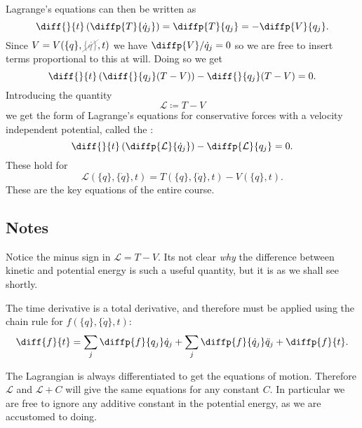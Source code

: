 \documentclass[fleqn]{NotesClass}
\newcommand*{\nodependence}[1]{\textcolor{gray}{\cancel{#1}}}
\newcommand*{\lagrangian}{\mathcal{L}}
\begin{document}
    Lagrange's equations can then be written as
    \begin{equation}
        \diff{}{t}\left( \diffp{T}{\dot{q}_j} \right) = \diffp{T}{q_j} = -\diffp{V}{q_j}.
    \end{equation}
    Since \(V = V(\{q\}, \nodependence{\{\dot{q}\}}, t)\) we have \(\diffp{V}/{\dot{q}_j} = 0\) so we are free to insert terms proportional to this at will.
    Doing so we get
    \begin{equation}
        \diff{}{t}\left( \diff{}{q_j}(T - V) \right) - \diff{}{q_j}(T - V) = 0.
    \end{equation}
    Introducing the quantity
    \begin{equation}
        \lagrangian \coloneqq T - V
    \end{equation}
    we get the form of Lagrange's equations for conservative forces with a velocity independent potential, called the :
    \begin{equation}
        \diff{}{t}\left( \diffp{\lagrangian}{\dot{q}_j} \right) - \diffp{\lagrangian}{q_j} = 0.
    \end{equation}
    These hold for
    \begin{equation}
        \lagrangian(\{q\}, \{\dot{q}\}, t) = T(\{q\}, \{\dot{q}\}, t) - V(\{q\}, t).
    \end{equation}
    These are the key equations of the entire course.
    
    \subsection{Notes}
    Notice the minus sign in \(\lagrangian = T - V\).
    Its not clear \emph{why} the difference between kinetic and potential energy is such a useful quantity, but it is as we shall see shortly.
    
    The time derivative is a total derivative, and therefore must be applied using the chain rule for \(f(\{q\}, \{\dot{q}\}, t)\):
    \begin{equation}
        \diff{f}{t} = \sum_j \diffp{f}{q_j}\dot{q}_j + \sum_j \diffp{f}{\dot{q}_j} \ddot{q}_j + \diffp{f}{t}.
    \end{equation}
    
    The Lagrangian is always differentiated to get the equations of motion.
    Therefore \(\lagrangian\) and \(\lagrangian + C\) will give the same equations for any constant \(C\).
    In particular we are free to ignore any additive constant in the potential energy, as we are accustomed to doing.
    
\end{document}
